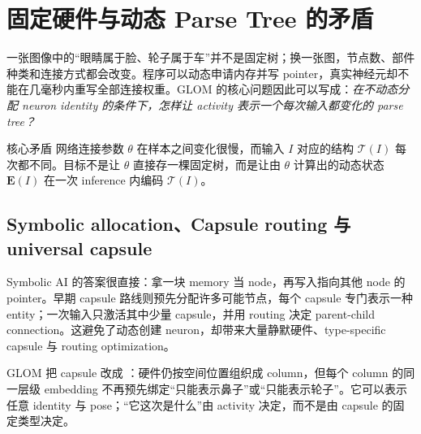\section{固定硬件与动态 Parse Tree 的矛盾}

一张图像中的“眼睛属于脸、轮子属于车”并不是固定树；换一张图，节点数、部件种类和连接方式都会改变。程序可以动态申请内存并写 pointer，真实神经元却不能在几毫秒内重写全部连接权重。GLOM 的核心问题因此可以写成：\emph{在不动态分配 neuron identity 的条件下，怎样让 activity 表示一个每次输入都变化的 parse tree？}


\begin{importantbox}{核心矛盾}
网络连接参数 $\theta$ 在样本之间变化很慢，而输入 $I$ 对应的结构 $\mathcal T(I)$ 每次都不同。目标不是让 $\theta$ 直接存一棵固定树，而是让由 $\theta$ 计算出的动态状态 $\mathbf E(I)$ 在一次 inference 内编码 $\mathcal T(I)$。
\end{importantbox}

\subsection{Symbolic allocation、Capsule routing 与 universal capsule}

Symbolic AI 的答案很直接：拿一块 memory 当 node，再写入指向其他 node 的 pointer。早期 capsule 路线则预先分配许多可能节点，每个 capsule 专门表示一种 entity；一次输入只激活其中少量 capsule，并用 routing 决定 parent-child connection。这避免了动态创建 neuron，却带来大量静默硬件、type-specific capsule 与 routing optimization。



GLOM 把 capsule 改成 ：硬件仍按空间位置组织成 column，但每个 column 的同一层级 embedding 不再预先绑定“只能表示鼻子”或“只能表示轮子”。它可以表示任意 identity 与 pose；“它这次是什么”由 activity 决定，而不是由 capsule 的固定类型决定。

